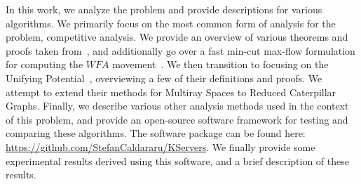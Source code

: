 In this work, we analyze the \KS problem and provide descriptions for various algorithms. We primarily focus on the most common form of analysis for the \KS problem, competitive analysis. We provide an overview of various theorems and proofs taken from~\cite{OnlineComp1998}, and additionally go over a fast min-cut max-flow formulation for computing the $WFA$ movement~\cite{mcfp2011}. We then transition to focusing on the Unifying Potential~\cite{unifyingPotential2021}, overviewing a few of their definitions and proofs. We attempt to extend their methods for Multiray Spaces to Reduced Caterpillar Graphs. Finally, we describe various other analysis methods used in the context of this problem, and provide an open-source software framework for testing and comparing these algorithms. The software package can be found here: \url{https://github.com/StefanCaldararu/KServers}. We finally provide some experimental results derived using this software, and a brief description of these results.